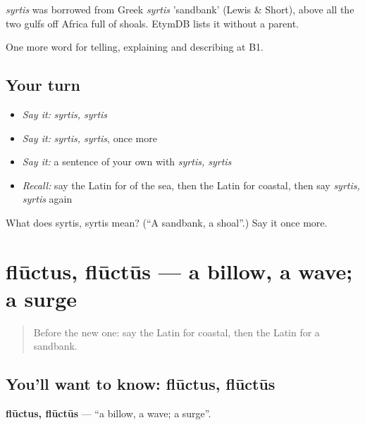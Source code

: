 \begin{cousinweb}
\emph{syrtis} was borrowed from Greek \emph{syrtis} 'sandbank' (Lewis \& Short), above all the two gulfs off Africa full of shoals. EtymDB lists it without a parent.
\end{cousinweb}

\begin{grammarlens}[title={What you've built}]
One more word for telling, explaining and describing at B1.
\end{grammarlens}

\subsection*{Your turn}
\begin{itemize}
\raggedright
  \item \emph{Say it:} \emph{syrtis, syrtis}
  \item \emph{Say it:} \emph{syrtis, syrtis}, once more
  \item \emph{Say it:} a sentence of your own with \emph{syrtis, syrtis}
  \item \emph{Recall:} say the Latin for of the sea, then the Latin for coastal, then say \emph{syrtis, syrtis} again
\end{itemize}

\begin{tcolorbox}[breakable,colback=teal!4,colframe=teal!35!black,title={Before you move on}]
What does syrtis, syrtis mean? (\textquotedblleft{}A sandbank, a shoal\textquotedblright{}.) Say it once more.
\end{tcolorbox}
\section[flūctus, flūctūs]{flūctus, flūctūs — a billow, a wave; a surge}

\label{lesson:LA-C443-fluctus}



\begin{quote}
Before the new one: say the Latin for coastal, then the Latin for a sandbank.
\end{quote}

\subsection*{You'll want to know: flūctus, flūctūs}
\textbf{flūctus, flūctūs} — \textquotedblleft{}a billow, a wave; a surge\textquotedblright{}.

